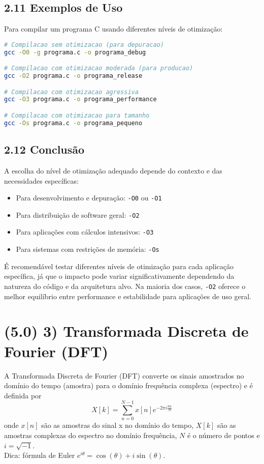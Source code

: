 \documentclass[12pt,a4paper]{article}
\begin{document}
\subsection*{2.11 Exemplos de Uso}
Para compilar um programa C usando diferentes níveis de otimização:
\begin{lstlisting}[language=bash]
# Compilacao sem otimizacao (para depuracao)
gcc -O0 -g programa.c -o programa_debug

# Compilacao com otimizacao moderada (para producao)
gcc -O2 programa.c -o programa_release

# Compilacao com otimizacao agressiva
gcc -O3 programa.c -o programa_performance

# Compilacao com otimizacao para tamanho
gcc -Os programa.c -o programa_pequeno
\end{lstlisting}

\subsection*{2.12 Conclusão}
A escolha do nível de otimização adequado depende do contexto e das necessidades específicas:
\begin{itemize}[leftmargin=*]
    \item Para desenvolvimento e depuração: \texttt{-O0} ou \texttt{-O1}
    \item Para distribuição de software geral: \texttt{-O2}
    \item Para aplicações com cálculos intensivos: \texttt{-O3}
    \item Para sistemas com restrições de memória: \texttt{-Os}
\end{itemize}
É recomendável testar diferentes níveis de otimização para cada aplicação específica, já que o impacto pode variar significativamente dependendo da natureza do código e da arquitetura alvo. Na maioria dos casos, \texttt{-O2} oferece o melhor equilíbrio entre performance e estabilidade para aplicações de uso geral.


\newpage
\section*{(5.0) 3) Transformada Discreta de Fourier (DFT)}
A Transformada Discreta de Fourier (DFT) converte os sinais amostrados no domínio do tempo (amostra) para o domínio frequência complexa (espectro) e é definida por
\[
X[k] = \sum_{n=0}^{N-1} x[n] e^{-2\pi i \frac{k n}{N}}
\]
onde $x[n]$ são as amostras do sinal x no domínio do tempo, $X[k]$ são as amostras complexas do espectro no domínio frequência, $N$ é o número de pontos e $i=\sqrt{-1}$. \\
Dica: fórmula de Euler $e^{i\theta} = \cos(\theta) + i\sin(\theta)$.
\end{document}
